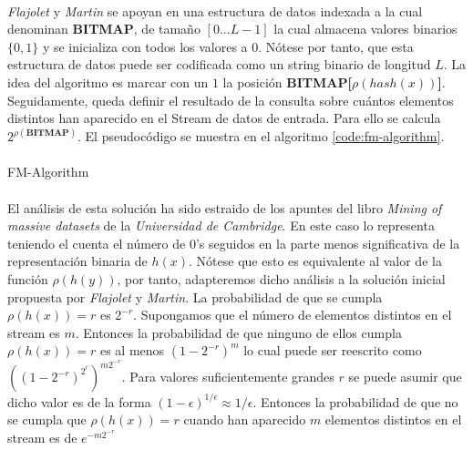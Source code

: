 \documentclass{subfiles}
\begin{document}
      \paragraph{}
      \emph{Flajolet} y \emph{Martin} se apoyan en una estructura de datos indexada a la cual denominan \textbf{BITMAP}, de tamaño $[0...L-1]$ la cual almacena valores binarios $\{ 0, 1\}$ y se inicializa con todos los valores a $0$. Nótese por tanto, que esta estructura de datos puede ser codificada como un string binario de longitud $L$. La idea del algoritmo es marcar con un $1$ la posición \textbf{BITMAP[$\rho(hash(x))$]}. Seguidamente, queda definir el resultado de la consulta sobre cuántos elementos distintos han aparecido en el Stream de datos de entrada. Para ello se calcula $2^{\rho(\textbf{BITMAP})}$. El pseudocódigo se muestra en el algoritmo \ref{code:fm-algorithm}.

      \paragraph{}
      \begin{algorithm}[h]
        \SetAlgoLined
        \caption{FM-Algorithm}
        \label{code:fm-algorithm}
      \end{algorithm}

      \paragraph{}
      El análisis de esta solución ha sido estraido de los apuntes del libro \emph{Mining of massive datasets} \cite{leskovec2014mining} de la \emph{Universidad de Cambridge}. En este caso lo representa teniendo el cuenta el número de $0$'s seguidos en la parte menos significativa de la representación binaria de $h(x)$. Nótese que esto es equivalente al valor de la función $\rho(h(y))$, por tanto, adapteremos dicho análisis a la solución inicial propuesta por \emph{Flajolet} y \emph{Martin}. La probabilidad de que se cumpla $\rho(h(x)) = r$ es $2^{-r}$. Supongamos que el número de elementos distintos en el stream es $m$. Entonces la probabilidad de que ninguno de ellos cumpla $\rho(h(x)) = r$ es al menos $(1- 2^{-r})^m$ lo cual puede ser reescrito como $((1- 2^{-r})^{2^r})^{m2^{-r}}$. Para valores suficientemente grandes $r$ se puede asumir que dicho valor es de la forma $(1-\epsilon)^{1/\epsilon} \approx 1/\epsilon$. Entonces la probabilidad de que no se cumpla que $\rho(h(x)) = r$ cuando han aparecido $m$ elementos distintos en el stream es de $e^{-m2^{-r}}$
\end{document}
